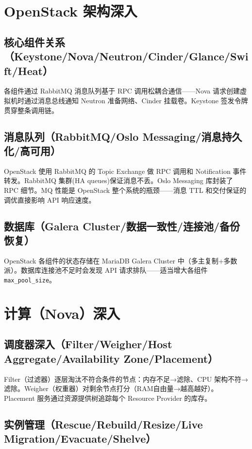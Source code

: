 \documentclass[12pt,UTF8]{ctexbook}
\begin{document}
  \section{OpenStack 架构深入}
    \subsection{核心组件关系（Keystone/Nova/Neutron/Cinder/Glance/Swift/Heat）}

各组件通过 RabbitMQ 消息队列基于 RPC 调用松耦合通信——Nova 请求创建虚拟机时通过消息总线通知 Neutron 准备网络、Cinder 挂载卷。Keystone 签发令牌贯穿整条调用链。

    \subsection{消息队列（RabbitMQ/Oslo Messaging/消息持久化/高可用）}

OpenStack 使用 RabbitMQ 的 Topic Exchange 做 RPC 调用和 Notification 事件转发。RabbitMQ 集群(HA queues)保证消息不丢。Oslo Messaging 库封装了 RPC 细节。MQ 性能是 OpenStack 整个系统的瓶颈——消息 TTL 和交付保证的调优直接影响 API 响应速度。

    \subsection{数据库（Galera Cluster/数据一致性/连接池/备份恢复）}

OpenStack 各组件的状态存储在 MariaDB Galera Cluster 中（多主复制+多数派）。数据库连接池不足时会发现 API 请求排队——适当增大各组件 \texttt{max\_pool\_size}。

  \section{计算（Nova）深入}
    \subsection{调度器深入（Filter/Weigher/Host Aggregate/Availability Zone/Placement）}

Filter（过滤器）逐层淘汰不符合条件的节点：内存不足→滤除、CPU 架构不符→滤除。Weigher（权重器）对剩余节点打分（RAM自由量→越高越好）。Placement 服务通过资源提供树追踪每个 Resource Provider 的库存。

    \subsection{实例管理（Rescue/Rebuild/Resize/Live Migration/Evacuate/Shelve）}
\end{document}
